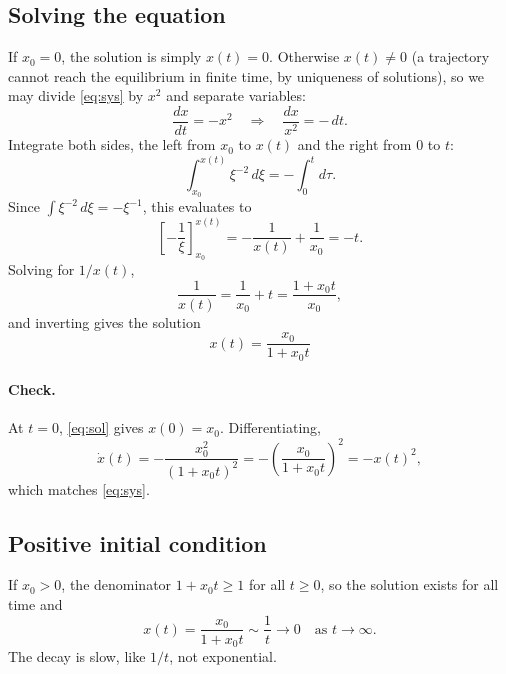 \documentclass[11pt]{article}
\begin{document}
\subsection*{Solving the equation}
If $x_0 = 0$, the solution is simply $x(t) = 0$. Otherwise $x(t) \ne 0$ (a trajectory cannot reach the equilibrium in finite time, by uniqueness of solutions), so we may divide \eqref{eq:sys} by $x^2$ and separate variables:
\begin{equation}
  \frac{dx}{dt} = -x^2
  \quad\Longrightarrow\quad
  \frac{dx}{x^2} = -\,dt .
  \label{eq:sep}
\end{equation}
Integrate both sides, the left from $x_0$ to $x(t)$ and the right from $0$ to $t$:
\begin{equation}
  \int_{x_0}^{x(t)} \xi^{-2}\, d\xi = -\int_0^t d\tau .
  \label{eq:int}
\end{equation}
Since $\int \xi^{-2}\,d\xi = -\xi^{-1}$, this evaluates to
\begin{equation}
  \left[-\frac{1}{\xi}\right]_{x_0}^{x(t)} = -\frac{1}{x(t)} + \frac{1}{x_0} = -t .
  \label{eq:eval}
\end{equation}
Solving for $1/x(t)$,
\begin{equation}
  \frac{1}{x(t)} = \frac{1}{x_0} + t = \frac{1 + x_0 t}{x_0},
  \label{eq:recip}
\end{equation}
and inverting gives the solution
\begin{equation}
  \boxed{\,x(t) = \frac{x_0}{1 + x_0 t}\,}
  \label{eq:sol}
\end{equation}

\paragraph{Check.} At $t = 0$, \eqref{eq:sol} gives $x(0) = x_0$. Differentiating,
\begin{equation}
  \dot{x}(t) = -\frac{x_0^2}{(1 + x_0 t)^2} = -\left(\frac{x_0}{1 + x_0 t}\right)^2 = -x(t)^2 ,
  \label{eq:check}
\end{equation}
which matches \eqref{eq:sys}.

\subsection*{Positive initial condition}
If $x_0 > 0$, the denominator $1 + x_0 t \ge 1$ for all $t \ge 0$, so the solution exists for all time and
\begin{equation}
  x(t) = \frac{x_0}{1 + x_0 t} \sim \frac{1}{t} \to 0 \quad \text{as } t \to \infty .
  \label{eq:pos}
\end{equation}
The decay is slow, like $1/t$, not exponential.
\end{document}
